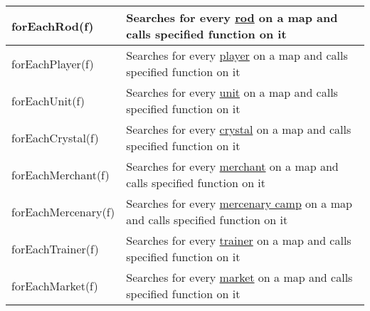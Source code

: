 \begin{center}
\begin{tabularx}{\linewidth}{| l | X |}
\hline
forEachRod(f) & Searches for every \hyperref[Rod]{rod} on a map and calls specified function on it\\
\hline
forEachPlayer(f) & Searches for every \hyperref[Player]{player} on a map and calls specified function on it\\
\hline
forEachUnit(f) & Searches for every \hyperref[Unit]{unit} on a map and calls specified function on it\\
\hline
forEachCrystal(f) & Searches for every \hyperref[Crystal]{crystal} on a map and calls specified function on it\\
\hline
forEachMerchant(f) & Searches for every \hyperref[Merchant]{merchant} on a map and calls specified function on it\\
\hline
forEachMercenary(f) & Searches for every \hyperref[Mercenary]{mercenary camp} on a map and calls specified function on it\\
\hline
forEachTrainer(f) & Searches for every \hyperref[Trainer]{trainer} on a map and calls specified function on it\\
\hline
forEachMarket(f) & Searches for every \hyperref[ResourceMarket]{market} on a map and calls specified function on it\\
\hline
\end{tabularx}
\end{center}
\newpage
